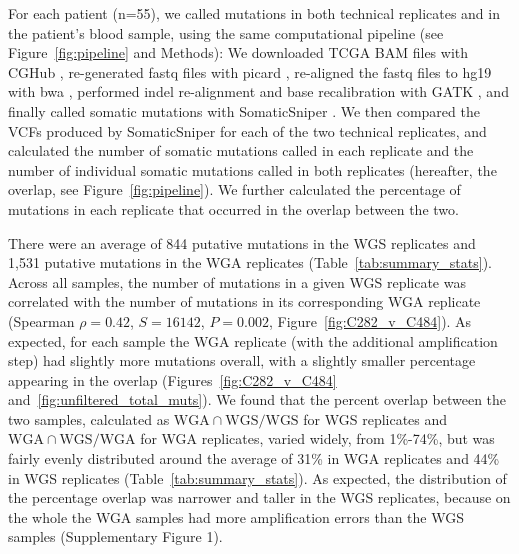 \documentclass[11 pt]{article} %
\begin{document}
For each patient (n=55), we called mutations in both technical replicates and in the patient's blood sample, using the same computational pipeline (see Figure~\ref{fig:pipeline} and Methods): We downloaded TCGA BAM files with CGHub \citep{CGHub}, re-generated fastq files with picard \citep{picard}, re-aligned the fastq files to hg19 with bwa \citep{bwa}, performed indel re-alignment and base recalibration with GATK \citep{GATK}, and finally called somatic mutations with SomaticSniper \citep{SomaticSniper}. We then compared the VCFs produced by SomaticSniper for each of the two technical replicates, and calculated the number of somatic mutations called in each replicate and the number of individual somatic mutations called in both replicates (hereafter, the overlap, see Figure~\ref{fig:pipeline}). We further calculated the percentage of mutations in each replicate that occurred in the overlap between the two. 

There were an average of 844 putative mutations in the WGS replicates and 1,531 putative mutations in the WGA replicates (Table~\ref{tab:summary_stats}). Across all samples, the number of mutations in a given WGS replicate was correlated with the number of mutations in its corresponding WGA replicate (Spearman $\rho=0.42$, $S=16142$, $P=0.002$, Figure~\ref{fig:C282_v_C484}). As expected, for each sample the WGA replicate (with the additional amplification step) had slightly more mutations overall, with a slightly smaller percentage appearing in the overlap (Figures~\ref{fig:C282_v_C484} and~\ref{fig:unfiltered_total_muts}). We found that the percent overlap between the two samples, calculated as $\text{WGA} \cap \text{WGS}/\text{WGS}$ for WGS replicates and $\text{WGA} \cap \text{WGS}/\text{WGA}$ for WGA replicates, varied widely, from 1\%-74\%, but was fairly evenly distributed around the average of 31\% in WGA replicates and 44\% in WGS replicates (Table~\ref{tab:summary_stats}). As expected, the distribution of the percentage overlap was narrower and taller in the WGS replicates, because on the whole the WGA samples had more amplification errors than the WGS samples (Supplementary Figure 1).
\end{document}
